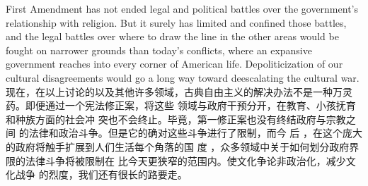 \begin{paracol}{2}
First Amendment has not ended legal and political battles over
the government's relationship with religion. But it surely has
limited and confined those battles, and the legal battles over
where to draw the line in the other areas would be fought on
narrower grounds than today's conflicts, where an expansive
government reaches into every corner of American life. Depoliticization of our cultural disagreements would go a long
way toward deescalating the cultural war.
\switchcolumn
现在，在以上讨论的以及其他许多领域，古典自由主义的解决办法不是一种万灵药。即便通过一个宪法修正案，将这些
领域与政府干预分开，在教育、小孩抚育和种族方面的社会冲
突也不会终止。毕竟，第一修正案也没有终结政府与宗教之间
的法律和政治斗争。但是它的确对这些斗争进行了限制，而今
后 ，在这个庞大的政府将触手扩展到人们生活每个角落的国
度 ，众多领域中关于如何划分政府界限的法律斗争将被限制在
比今天更狭窄的范围内。使文化争论非政治化，减少文化战争
的烈度，我们还有很长的路要走。

\end{paracol}